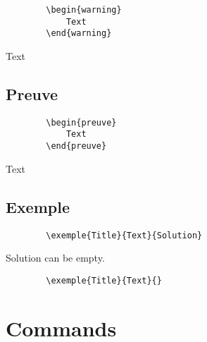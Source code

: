 \documentclass[french]{article}
\begin{document}
    \begin{verbatim}
        \begin{warning}
            Text
        \end{warning}
    \end{verbatim}

    \begin{warning}
        Text
    \end{warning}

    \subsection{Preuve}

    \begin{verbatim}
        \begin{preuve}
            Text
        \end{preuve}
    \end{verbatim}

    \begin{preuve}
        Text
    \end{preuve}

    \subsection{Exemple}
    

    \begin{verbatim}
        \exemple{Title}{Text}{Solution}
    \end{verbatim}


    \begin{warning}
        Solution can be empty.
    \end{warning}
    
    \begin{verbatim}
        \exemple{Title}{Text}{}
    \end{verbatim}


\section{Commands}
\end{document}
